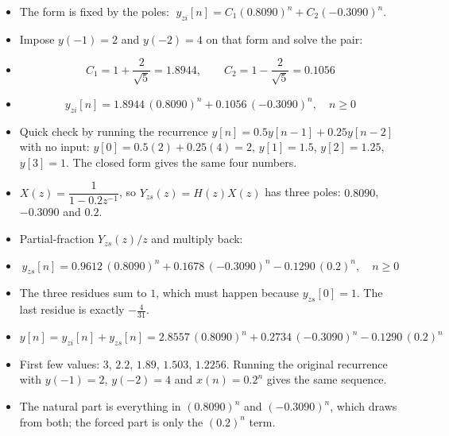 \begin{itemize}
  \item The form is fixed by the poles: $\;y_{zi}[n]=C_1(0.8090)^{n}+C_2(-0.3090)^{n}$.
  \item Impose $y(-1)=2$ and $y(-2)=4$ on that form and solve the pair:
  \item[] \[ C_1=1+\frac{2}{\sqrt5}=\mathbf{1.8944},\qquad
             C_2=1-\frac{2}{\sqrt5}=\mathbf{0.1056} \]
  \item[] \[ y_{zi}[n]=1.8944\,(0.8090)^{n}+0.1056\,(-0.3090)^{n},\quad n\ge0 \]
  \item Quick check by running the recurrence $y[n]=0.5y[n-1]+0.25y[n-2]$ with no input:
        $y[0]=0.5(2)+0.25(4)=2$, $y[1]=1.5$, $y[2]=1.25$, $y[3]=1$. The closed form gives
        the same four numbers.
\end{itemize}

\begin{itemize}
  \item $X(z)=\dfrac{1}{1-0.2z^{-1}}$, so $Y_{zs}(z)=H(z)X(z)$ has three poles:
        $0.8090$, $-0.3090$ and $0.2$.
  \item Partial-fraction $Y_{zs}(z)/z$ and multiply back:
  \item[] \[ y_{zs}[n]=0.9612\,(0.8090)^{n}+0.1678\,(-0.3090)^{n}
             -0.1290\,(0.2)^{n},\quad n\ge0 \]
  \item The three residues sum to $1$, which must happen because $y_{zs}[0]=1$.
         The last residue is exactly $-\tfrac{4}{31}$.
\end{itemize}

\begin{itemize}
  \item[] \[ y[n]=y_{zi}[n]+y_{zs}[n]
             =2.8557\,(0.8090)^{n}+0.2734\,(-0.3090)^{n}-0.1290\,(0.2)^{n} \]
  \item First few values: $3$, $2.2$, $1.89$, $1.503$, $1.2256$. Running the original
        recurrence with $y(-1)=2$, $y(-2)=4$ and $x(n)=0.2^{n}$ gives the same sequence.
  \item {} The natural part is everything in $(0.8090)^n$ and $(-0.3090)^n$,
        which draws from both; the forced part is only the $(0.2)^n$ term.
\end{itemize}

